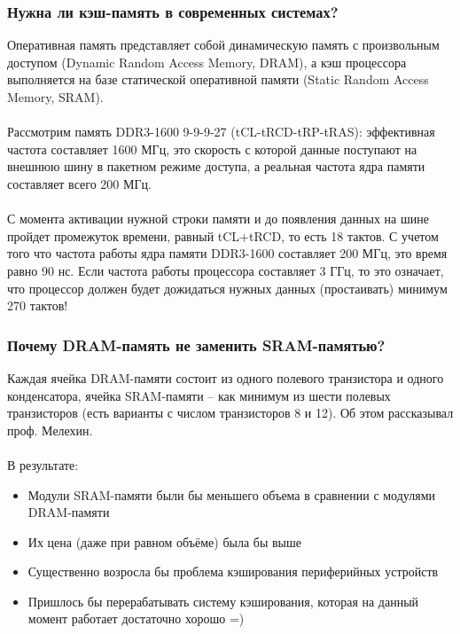 \documentclass{beamer}
\begin{document}
\begin{frame}
\frametitle{Нужна ли кэш-память в современных системах?}

Оперативная память представляет собой динамическую память с произвольным доступом (Dynamic Random Access Memory, DRAM), а кэш процессора выполняется на базе статической оперативной памяти (Static Random Access Memory, SRAM).\\~\\

Рассмотрим память DDR3-1600 9-9-9-27 (tCL-tRCD-tRP-tRAS): эффективная частота составляет 1600 МГц, это скорость с которой данные поступают на внешнюю шину в пакетном режиме доступа, а реальная частота ядра памяти составляет всего 200 МГц.\\~\\

С момента активации нужной строки памяти и до появления данных на шине пройдет промежуток времени, равный tCL+tRCD, то есть 18 тактов. С учетом того что частота работы ядра памяти DDR3-1600 составляет 200 МГц, это время равно 90 нс. Если частота работы процессора составляет 3 ГГц, то это означает, что процессор должен будет дожидаться нужных данных (простаивать) минимум 270 тактов!

\end{frame}


\begin{frame}
\frametitle{Почему DRAM-память не заменить SRAM-памятью?}

Каждая ячейка DRAM-памяти состоит из одного полевого транзистора и одного конденсатора, ячейка SRAM-памяти -- как минимум из шести полевых транзисторов (есть варианты с числом транзисторов 8 и 12). Об этом рассказывал проф. Мелехин.\\~\\

В результате:
\begin{itemize}
\item Модули SRAM-памяти были бы меньшего объема в сравнении с модулями DRAM-памяти
\item Их цена (даже при равном объёме) была бы выше
\item Существенно возросла бы проблема кэширования периферийных устройств
\item Пришлось бы перерабатывать систему кэширования, которая на данный момент работает достаточно хорошо =)
\end{itemize}

\end{frame}
\end{document}
